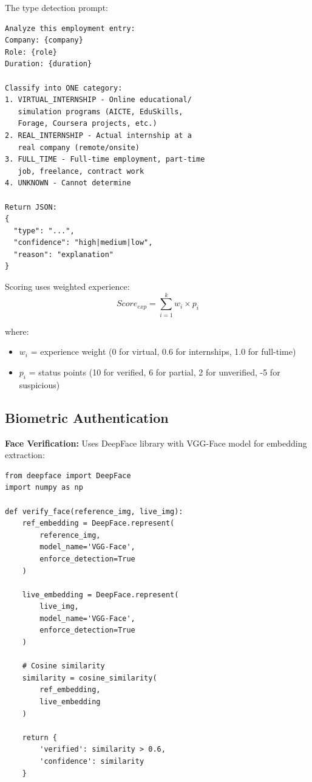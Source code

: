 \documentclass[journal]{IEEEtran}
\begin{document}
The type detection prompt:
\begin{verbatim}
Analyze this employment entry:
Company: {company}
Role: {role}
Duration: {duration}

Classify into ONE category:
1. VIRTUAL_INTERNSHIP - Online educational/
   simulation programs (AICTE, EduSkills, 
   Forage, Coursera projects, etc.)
2. REAL_INTERNSHIP - Actual internship at a
   real company (remote/onsite)
3. FULL_TIME - Full-time employment, part-time
   job, freelance, contract work
4. UNKNOWN - Cannot determine

Return JSON: 
{
  "type": "...",
  "confidence": "high|medium|low",
  "reason": "explanation"
}
\end{verbatim}

Scoring uses weighted experience:
\begin{equation}
Score_{exp} = \sum_{i=1}^{k} w_i \times p_i
\end{equation}

where:
\begin{itemize}
\item $w_i$ = experience weight (0 for virtual, 0.6 for internships, 1.0 for full-time)
\item $p_i$ = status points (10 for verified, 6 for partial, 2 for unverified, -5 for suspicious)
\end{itemize}

\subsection{Biometric Authentication}

\textbf{Face Verification:}
Uses DeepFace library with VGG-Face model for embedding extraction:

\begin{verbatim}
from deepface import DeepFace
import numpy as np

def verify_face(reference_img, live_img):
    ref_embedding = DeepFace.represent(
        reference_img, 
        model_name='VGG-Face',
        enforce_detection=True
    )
    
    live_embedding = DeepFace.represent(
        live_img,
        model_name='VGG-Face',
        enforce_detection=True
    )
    
    # Cosine similarity
    similarity = cosine_similarity(
        ref_embedding, 
        live_embedding
    )
    
    return {
        'verified': similarity > 0.6,
        'confidence': similarity
    }
\end{verbatim}
\end{document}
